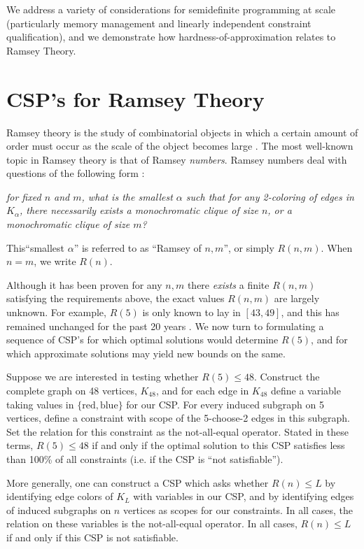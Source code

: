 \documentclass[12pt]{article} %
\begin{document}
We address a variety of considerations for semidefinite programming at scale (particularly memory management and linearly independent constraint qualification), and we demonstrate how hardness-of-approximation relates to Ramsey Theory.


\section{CSP's for Ramsey Theory}
Ramsey theory is the study of combinatorial objects in which a certain amount of order must occur as the scale of the object becomes large \cite{rt}. The most well-known topic in Ramsey theory is that of Ramsey \textit{numbers}. Ramsey numbers deal with questions of the following form : 

\vspace{1em}
\noindent \textit{for fixed $n$ and $m$, what is the smallest $\alpha$ such that for \textit{any} 2-coloring of edges in $K_\alpha$, there necessarily exists a monochromatic clique of size $n$, or a monochromatic clique of size $m$?}
\vspace{1em}

This``smallest $\alpha$'' is referred to as ``Ramsey of $n,m$'', or simply $R(n,m)$. When $n = m$, we write $R(n)$.

Although it has been proven for any $n,m$ there \textit{exists} a finite $R(n,m)$ satisfying the requirements above, the exact values $R(n,m)$ are largely unknown. For example, $R(5)$ is only known to lay in $[43,49]$, and this has remained unchanged for the past 20 years \cite{rn}. We now turn to formulating a sequence of CSP's for which optimal solutions would determine $R(5)$, and for which approximate solutions may yield new bounds on the same.

Suppose we are interested in testing whether $R(5) \leq 48$. Construct the complete graph on 48 vertices, $K_{48}$, and for each edge in $K_{48}$ define a variable taking values in $\{\text{red},\text{blue}\}$ for our CSP. For every induced subgraph on 5 vertices, define a constraint with scope of the 5-choose-2 edges in this subgraph. Set the relation for this constraint as the not-all-equal operator. Stated in these terms, $R(5) \leq 48$ if and only if the optimal solution to this CSP satisfies less than 100\% of all constraints (i.e. if the CSP is ``not satisfiable'').

More generally, one can construct a CSP which asks whether $R(n) \leq L$ by identifying edge colors of $K_L$ with variables in our CSP, and by identifying edges of induced subgraphs on $n$ vertices as scopes for our constraints. In all cases, the relation on these variables is the not-all-equal operator. In all cases, $R(n) \leq L$ if and only if this CSP is not satisfiable.
\end{document}
